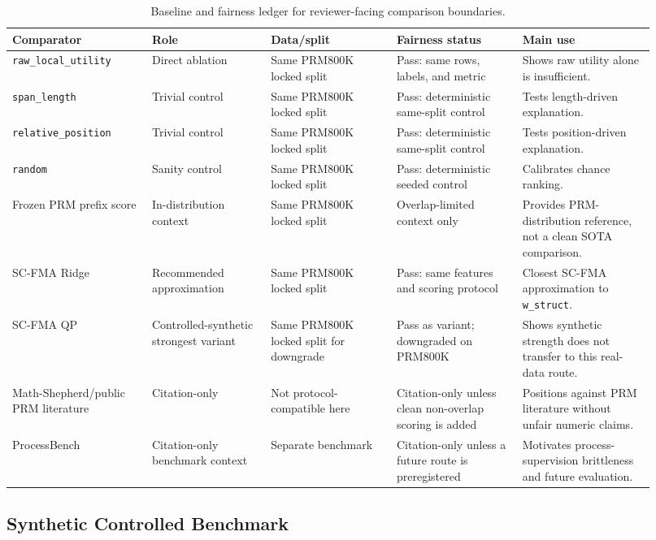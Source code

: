 \documentclass[a4paper,fleqn]{cas-sc}
\begin{document}
\begin{table}[t]
\caption{Baseline and fairness ledger for reviewer-facing comparison boundaries.}
\label{tab:baseline-ledger}
\centering
\scriptsize
\begin{tabular}{p{0.20\linewidth}p{0.17\linewidth}p{0.18\linewidth}p{0.18\linewidth}p{0.19\linewidth}}
\toprule
\textbf{Comparator} & \textbf{Role} & \textbf{Data/split} & \textbf{Fairness status} & \textbf{Main use} \\
\midrule
\texttt{raw\_local\_utility} & Direct ablation & Same PRM800K locked split & Pass: same rows, labels, and metric & Shows raw utility alone is insufficient. \\
\texttt{span\_length} & Trivial control & Same PRM800K locked split & Pass: deterministic same-split control & Tests length-driven explanation. \\
\texttt{relative\_position} & Trivial control & Same PRM800K locked split & Pass: deterministic same-split control & Tests position-driven explanation. \\
\texttt{random} & Sanity control & Same PRM800K locked split & Pass: deterministic seeded control & Calibrates chance ranking. \\
Frozen PRM prefix score & In-distribution context & Same PRM800K locked split & Overlap-limited context only & Provides PRM-distribution reference, not a clean SOTA comparison. \\
SC-FMA Ridge & Recommended approximation & Same PRM800K locked split & Pass: same features and scoring protocol & Closest SC-FMA approximation to \texttt{w\_struct}. \\
SC-FMA QP & Controlled-synthetic strongest variant & Same PRM800K locked split for downgrade & Pass as variant; downgraded on PRM800K & Shows synthetic strength does not transfer to this real-data route. \\
Math-Shepherd/public PRM literature & Citation-only & Not protocol-compatible here & Citation-only unless clean non-overlap scoring is added & Positions against PRM literature without unfair numeric claims. \\
ProcessBench & Citation-only benchmark context & Separate benchmark & Citation-only unless a future route is preregistered & Motivates process-supervision brittleness and future evaluation. \\
\bottomrule
\end{tabular}
\end{table}

\subsection{Synthetic Controlled Benchmark}
\end{document}
